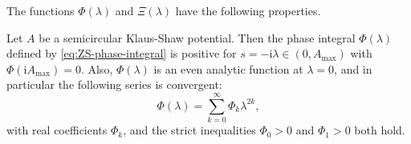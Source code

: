 \documentclass[12pt]{amsart}
\numberwithin{equation}{section}
\newcommand{\ii}{\mathrm{i}}
\newcommand{\SP}{\lambda}
\newcommand{\phaseint}{\Phi}
\newcommand{\tailint}{\Xi}
\begin{document}
The functions $\phaseint(\lambda)$ and $\tailint(\lambda)$ have the following properties.
\begin{prop}
Let $A$ be a semicircular Klaus-Shaw potential.  Then the phase integral $\phaseint(\SP)$ defined by \eqref{eq:ZS-phase-integral}
is positive for $s=-\ii\lambda\in (0,A_\mathrm{max})$ with $\phaseint(\ii A_\mathrm{max})=0$.  Also, $\phaseint(\SP)$ is an even analytic function at $\SP=0$, and in particular the following series is convergent:
\begin{equation}
\phaseint(\lambda)=\sum_{k=0}^\infty\phaseint_{k}\lambda^{2k}, 
\label{eq:Psi-series}
\end{equation}
with real coefficients $\phaseint_k$, and the strict inequalities $\phaseint_0>0$ and $\phaseint_1>0$ both hold.
\label{prop:Psi-even-analytic}
\end{prop}
\end{document}
